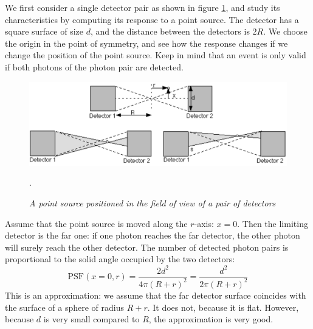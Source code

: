 We first consider a single detector pair as shown in figure
\ref{fig:petdetectorpair}, and study its characteristics by computing its
response to a point source. The detector has a square surface of size $d$, and
the distance between the detectors is $2R$. We choose the origin in the point of
symmetry, and see how the response changes if we change the position of the
point source. Keep in mind that an event is only valid if both photons of the
photon pair are detected.
%
\begin{figure}[tb]
\centering
\includegraphics[width=\figbig]{figs/fig_petdetectorpair.pdf}
\caption{\label{fig:petdetectorpair} \emph{A point source positioned in the
field of view of a pair of detectors}}.
\end{figure}

Assume that the point source is moved along the $r$-axis: $x = 0$. Then the
limiting detector is the far one: if one photon reaches the far detector, the
other photon will surely reach the other detector. The number of detected
photon pairs is proportional to the solid angle occupied by the two detectors:
\begin{equation}
  \mbox{PSF}(x=0, r) = \frac{2 d^2}{4 \pi (R+r)^2} = \frac{d^2}{2 \pi (R+r)^2}
\end{equation}
This is an approximation: we assume that the far detector surface coincides
with the surface of a sphere of radius $R+r$. It does not, because it is flat.
However, because $d$ is very small compared to $R$, the approximation is very
good.

